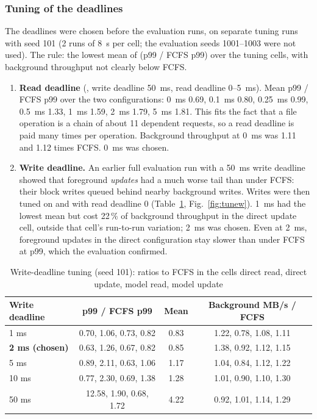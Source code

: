 \documentclass[12pt,a4paper]{article}
\DeclareRobustCommand{\code}[1]{\texttt{\detokenize{#1}}}
\newcommand{\figref}[1]{Fig.~\ref{#1}}
\newcommand{\tabref}[1]{Table~\ref{#1}}
\begin{document}
\subsubsection{Tuning of the deadlines}
\label{sec:tuning}
The deadlines were chosen before the evaluation runs, on separate tuning runs with seed 101 (2 runs of 8~s per cell; the evaluation seeds 1001--1003 were not used). The rule: the lowest mean of (p99 / FCFS p99) over the tuning cells, with background throughput not clearly below FCFS.
\begin{enumerate}[leftmargin=1.6em]
  \item \textbf{Read deadline} (\code{bg2_read}, write deadline 50~ms, read deadline 0--5~ms). Mean p99 / FCFS p99 over the two configurations: 0~ms 0.69, 0.1~ms 0.80, 0.25~ms 0.99, 0.5~ms 1.33, 1~ms 1.59, 2~ms 1.79, 5~ms 1.81. This fits the fact that a file operation is a chain of about 11 dependent requests, so a read deadline is paid many times per operation. Background throughput at 0~ms was 1.11 and 1.12 times FCFS. 0~ms was chosen.
  \item \textbf{Write deadline.} An earlier full evaluation run with a 50~ms write deadline showed that foreground \emph{updates} had a much worse tail than under FCFS: their block writes queued behind nearby background writes. Writes were then tuned on \code{bg2_read} and \code{bg2_update} with read deadline 0 (\tabref{tab:tunew}, \figref{fig:tunew}). 1~ms had the lowest mean but cost 22\,\% of background throughput in the direct update cell, outside that cell's run-to-run variation; 2~ms was chosen. Even at 2~ms, foreground updates in the direct configuration stay slower than under FCFS at p99, which the evaluation confirmed.
\end{enumerate}

\begin{table}[!htbp]
\centering
\caption[Write-deadline tuning, ratios to FCFS]{Write-deadline tuning (seed 101): ratios to FCFS in the cells direct read, direct update, model read, model update}
\label{tab:tunew}
\small
\begin{tabular}{@{}l c c c@{}}
\toprule
\textbf{Write deadline} & \textbf{p99 / FCFS p99} & \textbf{Mean} & \textbf{Background MB/s / FCFS} \\
\midrule
1 ms & 0.70, 1.06, 0.73, 0.82 & 0.83 & 1.22, 0.78, 1.08, 1.11 \\
\textbf{2 ms (chosen)} & 0.63, 1.26, 0.67, 0.82 & 0.85 & 1.38, 0.92, 1.12, 1.15 \\
5 ms & 0.89, 2.11, 0.63, 1.06 & 1.17 & 1.04, 0.84, 1.12, 1.22 \\
10 ms & 0.77, 2.30, 0.69, 1.38 & 1.28 & 1.01, 0.90, 1.10, 1.30 \\
50 ms & 12.58, 1.90, 0.68, 1.72 & 4.22 & 0.92, 1.01, 1.14, 1.29 \\
\bottomrule
\end{tabular}
\end{table}
\end{document}
